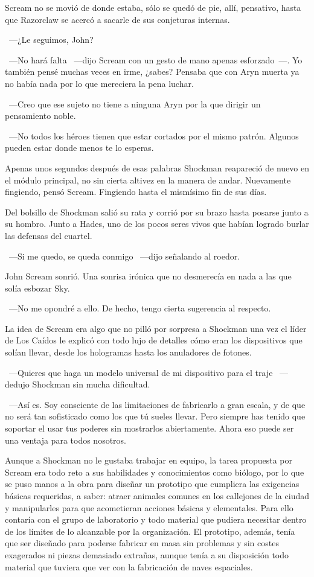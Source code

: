 Scream no se movió de donde estaba, sólo se quedó de pie, allí, pensativo, hasta que Razorclaw se acercó a sacarle de sus conjeturas internas.

~---¿Le seguimos, John?

~---No hará falta ~---dijo Scream con un gesto de mano apenas esforzado~---. Yo también pensé muchas veces en irme, ¿sabes? Pensaba que con Aryn muerta ya no había nada por lo que mereciera la pena luchar.

~---Creo que ese sujeto no tiene a ninguna Aryn por la que dirigir un pensamiento noble.

~---No todos los héroes tienen que estar cortados por el mismo patrón. Algunos pueden estar donde menos te lo esperas.

Apenas unos segundos después de esas palabras Shockman reapareció de nuevo en el módulo principal, no sin cierta altivez en la manera de andar. Nuevamente fingiendo, pensó Scream. Fingiendo hasta el mismísimo fin de sus días.

Del bolsillo de Shockman salió su rata y corrió por su brazo hasta posarse junto a su hombro. Junto a Hades, uno de los pocos seres vivos que habían logrado burlar las defensas del cuartel.

~---Si me quedo, se queda conmigo ~---dijo señalando al roedor.

John Scream sonrió. Una sonrisa irónica que no desmerecía en nada a las que solía esbozar Sky.

~---No me opondré a ello. De hecho, tengo cierta sugerencia al respecto.

\parbreak
La idea de Scream era algo que no pilló por sorpresa a Shockman una vez el líder de Los Caídos le explicó con todo lujo de detalles cómo eran los dispositivos que solían llevar, desde los hologramas hasta los anuladores de fotones.

~---Quieres que haga un modelo universal de mi dispositivo para el traje ~---dedujo Shockman sin mucha dificultad.

~---Así es. Soy consciente de las limitaciones de fabricarlo a gran escala, y de que no será tan sofisticado como los que tú sueles llevar. Pero siempre has tenido que soportar el usar tus poderes sin mostrarlos abiertamente. Ahora eso puede ser una ventaja para todos nosotros.

Aunque a Shockman no le gustaba trabajar en equipo, la tarea propuesta por Scream era todo reto a sus habilidades y conocimientos como biólogo, por lo que se puso manos a la obra para diseñar un prototipo que cumpliera las exigencias básicas requeridas, a saber: atraer animales comunes en los callejones de la ciudad y manipularles para que acometieran acciones básicas y elementales. Para ello contaría con el grupo de laboratorio y todo material que pudiera necesitar dentro de los límites de lo alcanzable por la organización. El prototipo, además, tenía que ser diseñado para poderse fabricar en masa sin problemas y sin costes exagerados ni piezas demasiado extrañas, aunque tenía a su disposición todo material que tuviera que ver con la fabricación de naves espaciales.

